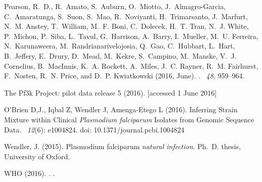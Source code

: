 \documentclass{bioinfo}
\begin{document}
\begin{thebibliography}{}
Pearson, R.~D., R.~Amato, S.~Auburn, O.~Miotto, J.~Almagro-Garcia,
  C.~Amaratunga, S.~Suon, S.~Mao, R.~Noviyanti, H.~Trimarsanto, J.~Marfurt,
  N.~M. Anstey, T.~William, M.~F. Boni, C.~Dolecek, H.~T. Tran, N.~J. White,
  P.~Michon, P.~Siba, L.~Tavul, G.~Harrison, A.~Barry, I.~Mueller, M.~U.
  Ferreira, N.~Karunaweera, M.~Randrianarivelojosia, Q.~Gao, C.~Hubbart,
  L.~Hart, B.~Jeffery, E.~Drury, D.~Mead, M.~Kekre, S.~Campino, M.~Manske,
  V.~J. Cornelius, B.~MacInnis, K.~A. Rockett, A.~Miles, J.~C. Rayner, R.~M.
  Fairhurst, F.~Nosten, R.~N. Price, and D.~P. Kwiatkowski (2016, June).
.
~{\em 48}, 959--964.

The Pf3k Project: pilot data release 5 (2016).
 [accessed 1 June 2016]

O'Brien D,J., Iqbal Z, Wendler J, Amenga-Etego L (2016). \newblock Inferring Strain Mixture within Clinical {\em Plasmodium falciparum} Isolates from Genomic Sequence Data. ~{\em 12\/}(6): e1004824. doi: 10.1371/journal.pcbi.1004824


Wendler, J. (2015).
 {P}lasmodium falciparum {\em natural infection}.
\newblock Ph.\ D. thesis, University of Oxford.

WHO (2016).
.
.



\end{thebibliography}
\end{document}
